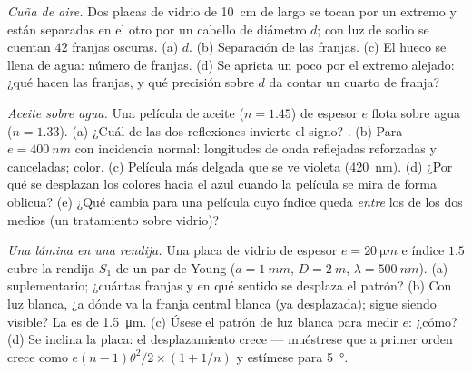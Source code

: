 \begin{exercise}[$\star\star$]\label{exo:b2:two-wave-interference:8}
\emph{Cuña de aire.} Dos placas de vidrio de \qty{10}{cm} de largo se tocan por un extremo y
están separadas en el otro por un cabello de diámetro $d$; con luz de sodio
se cuentan $42$ franjas oscuras. (a) $d$. (b) Separación de las franjas. (c) El hueco
se llena de agua: número de franjas. (d) Se aprieta un poco por el extremo alejado:
¿qué hacen las franjas, y qué precisión sobre
$d$ da contar un cuarto de franja?
\end{exercise}

\begin{exercise}[$\star\star$]\label{exo:b2:two-wave-interference:9}
\emph{Aceite sobre agua.} Una película de aceite ($n = 1.45$) de espesor $e$ flota
sobre agua ($n = 1.33$). (a) ¿Cuál de las dos reflexiones invierte el
signo? . (b) Para $e = \qty{400}{nm}$ con incidencia normal:
longitudes de onda reflejadas reforzadas y canceladas; color. (c) Película más delgada
que se ve violeta (\qty{420}{nm}). (d) ¿Por qué se desplazan los colores hacia el
azul cuando la película se mira de forma oblicua? (e) ¿Qué cambia para una película
cuyo índice queda \emph{entre} los de los dos medios (un tratamiento sobre
vidrio)?
\end{exercise}

\begin{exercise}[$\star\star\star$]\label{exo:b2:two-wave-interference:10}
\emph{Una lámina en una rendija.} Una placa de vidrio de espesor $e = \qty{20}{\micro m}$
e índice $1.5$ cubre la rendija $S_1$ de un par de Young ($a = \qty{1}{mm}$, $D =
\qty{2}{m}$, $\lambda = \qty{500}{nm}$). (a)  suplementario; ¿cuántas franjas
y en qué sentido se desplaza el patrón? (b) Con luz blanca,
¿a dónde va la franja central blanca (ya desplazada); sigue siendo
visible? La  es de \qty{1.5}{\micro m}. (c) Úsese el patrón de luz
blanca para medir $e$: ¿cómo? (d) Se inclina la placa: el desplazamiento crece
--- muéstrese que a primer orden crece como $e(n - 1)\theta^2/2 \times (1 + 1/n)$
y estímese para \qty{5}{\degree}.
\end{exercise}

